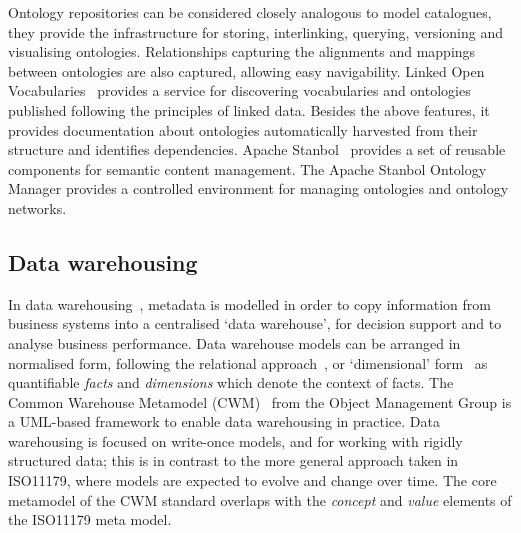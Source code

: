 
Ontology repositories can be considered closely analogous to model
catalogues, they provide the infrastructure for storing, interlinking,
querying, versioning and visualising ontologies. Relationships
capturing the alignments and mappings between ontologies are also
captured, allowing easy navigability. Linked Open
Vocabularies~\cite{LOV} provides a service for discovering
vocabularies and ontologies published following the principles of
linked data. Besides the above features, it provides documentation
about ontologies automatically harvested from their structure and
identifies dependencies. Apache Stanbol~\cite{Stanbol} provides a set
of reusable components for semantic content management. The Apache
Stanbol Ontology Manager provides a controlled environment for
managing ontologies and ontology networks. 



\subsection{Data warehousing}

In data warehousing~\cite{kim02}, metadata is modelled in order to copy
information from business systems into a centralised `data warehouse',
for decision support and to analyse business performance. Data
warehouse models can be arranged in normalised form, following the
relational approach~\cite{inm92}, or `dimensional' form~\cite{kim02}
as quantifiable \emph{facts} and \emph{dimensions} which denote the
context of facts. The Common Warehouse Metamodel (CWM)~\cite{poole03}
from the Object Management Group is a UML-based framework to enable
data warehousing in practice. Data warehousing is focused on
write-once models, and for working with rigidly structured data; this
is in contrast to the more general approach taken in ISO11179, where
models are expected to evolve and change over time. 
The core metamodel of the CWM standard overlaps with the 
\emph{concept} and \emph{value} elements of the ISO11179 meta model.

